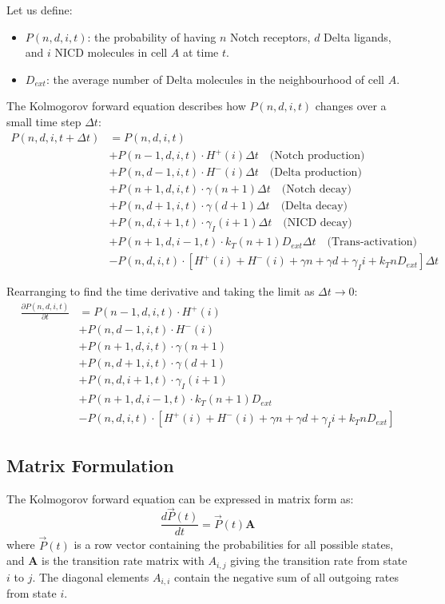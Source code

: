 \documentclass{article}
\begin{document}
\begin{flushleft}
Let us define:
\begin{itemize}
    \item $P(n,d,i,t)$: the probability of having $n$ Notch receptors, $d$ Delta ligands, and $i$ NICD molecules in cell $A$ at time $t$.
    \item $D_{ext}$: the average number of Delta molecules in the neighbourhood of cell $A$.
\end{itemize}

The Kolmogorov forward equation describes how $P(n,d,i,t)$ changes over a small time step $\Delta t$:
\begin{align*}
P(n,d,i,t+\Delta t) &= P(n,d,i,t) \\
&+ P(n-1,d,i,t) \cdot H^+(i) \Delta t \quad \text{(Notch production)} \\
&+ P(n,d-1,i,t) \cdot H^-(i) \Delta t \quad \text{(Delta production)} \\
&+ P(n+1,d,i,t) \cdot \gamma(n+1)\Delta t \quad \text{(Notch decay)} \\
&+ P(n,d+1,i,t) \cdot \gamma(d+1)\Delta t \quad \text{(Delta decay)} \\
&+ P(n,d,i+1,t) \cdot \gamma_I(i+1)\Delta t \quad \text{(NICD decay)} \\
&+ P(n+1,d,i-1,t) \cdot k_T(n+1)D_{ext}\Delta t \quad \text{(Trans-activation)} \\
&- P(n,d,i,t) \cdot [H^+(i) + H^-(i) + \gamma n + \gamma d + \gamma_I i + k_T n D_{ext}]\Delta t
\end{align*}

Rearranging to find the time derivative and taking the limit as $\Delta t \rightarrow 0$:
\begin{align*}
\frac{\partial P(n,d,i,t)}{\partial t} &= P(n-1,d,i,t) \cdot H^+(i) \\
&+ P(n,d-1,i,t) \cdot H^-(i) \\
&+ P(n+1,d,i,t) \cdot \gamma(n+1) \\
&+ P(n,d+1,i,t) \cdot \gamma(d+1) \\
&+ P(n,d,i+1,t) \cdot \gamma_I(i+1) \\
&+ P(n+1,d,i-1,t) \cdot k_T(n+1)D_{ext} \\
&- P(n,d,i,t) \cdot [H^+(i) + H^-(i) + \gamma n + \gamma d + \gamma_I i + k_T n D_{ext}]
\end{align*}

\subsection*{Matrix Formulation}
The Kolmogorov forward equation can be expressed in matrix form as:
\[
\frac{d\vec{P}(t)}{dt} = \vec{P}(t)\mathbf{A}
\]
where $\vec{P}(t)$ is a row vector containing the probabilities for all possible states, and $\mathbf{A}$ is the transition rate matrix with $A_{i,j}$ giving the transition rate from state $i$ to $j$. The diagonal elements $A_{i,i}$ contain the negative sum of all outgoing rates from state $i$.


\end{flushleft}
\end{document}
